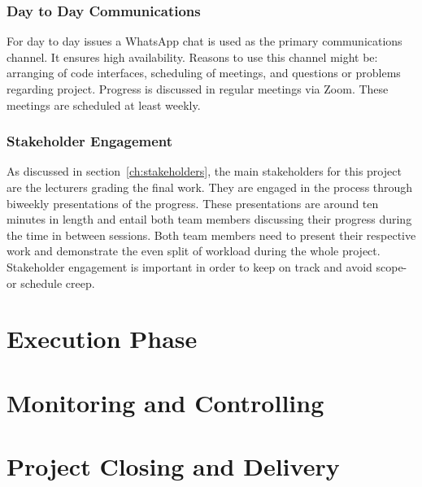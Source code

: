 \subsubsection{Day to Day Communications}
\label{ch:daytodaycomms}
For day to day issues a WhatsApp chat is used as the primary communications channel. It ensures high availability. Reasons to use this channel might be: arranging of code interfaces, scheduling of meetings, and questions or problems regarding project. Progress is discussed in regular meetings via Zoom. These meetings are scheduled at least weekly.


\subsubsection{Stakeholder Engagement}
\label{ch:stakeholerengagement}
As discussed in section~\ref{ch:stakeholders}, the main stakeholders for this project are the lecturers grading the final work. They are engaged in the process through biweekly presentations of the progress. These presentations are around ten minutes in length and entail both team members discussing their progress during the time in between sessions. Both team members need to present their respective work and demonstrate the even split of workload during the whole project. Stakeholder engagement is important in order to keep on track and avoid scope- or schedule creep.


\section{Execution Phase}
\label{ch:executionphase}

\section{Monitoring and Controlling}
\label{ch:monitoringcontrolling}

\section{Project Closing and Delivery}
\label{ch:projectclosing}


